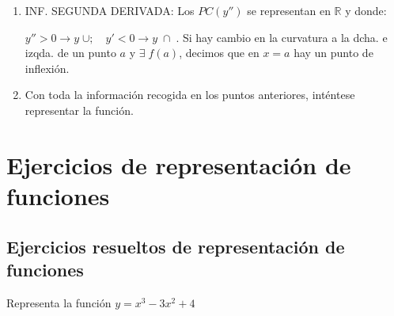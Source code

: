 \begin{enumerate}
	 \item INF. SEGUNDA DERIVADA: Los $PC(y'')$ se representan en $\mathbb R$ y donde:
	
	 $y''>0 \to y \; \cup; \quad y'<0 \to y \; \cap \;$.  Si hay cambio en la curvatura a la dcha. e izqda. de un punto $a$ y $\exists \; f(a)$, decimos que en $x=a$ hay un punto de inflexión. 
	 
	 \item Con toda la información recogida en los puntos anteriores, inténtese representar la función.	 

	
\end{enumerate}




	
\section{Ejercicios de representación de funciones}




\subsection{Ejercicios resueltos de representación de funciones}


\begin{ejre} Representa la función $y=x^3-3x^2+4$
	
\end{ejre}

